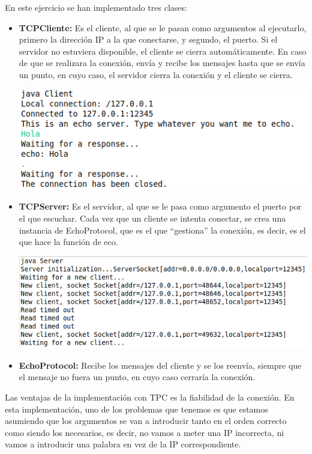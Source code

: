 \documentclass{article}
\begin{document}
En este ejercicio se han implementado tres clases:

\begin{itemize}
\item \textbf{TCPCliente:} Es el cliente, al que se le pasan como argumentos al ejecutarlo, primero la dirección IP a la que conectarse, y segundo, el puerto. Si el servidor no estuviera disponible, el cliente se cierra automáticamente. En caso de que se realizara la conexión, envía y recibe los mensajes hasta que se envía un punto, en cuyo caso, el servidor cierra la conexión y el cliente se cierra.
\begin{center}
\includegraphics[scale=0.4]{images/TCPClient.png}
\end{center}
\item \textbf{TCPServer:} Es el servidor, al que se le pasa como argumento el puerto por el que escuchar. Cada vez que un cliente se intenta conectar, se crea una instancia de EchoProtocol, que es el que “gestiona” la conexión, es decir, es el que hace la función de eco.
\begin{center}
\includegraphics[scale=0.4]{images/TCPServer.png}
\end{center}
\item \textbf{EchoProtocol:} Recibe los mensajes del cliente y se los reenvía, siempre que el mensaje no fuera un punto, en cuyo caso cerraría la conexión.
\end{itemize}

Las ventajas de la implementación con TPC es la fiabilidad de la conexión. En esta implementación, uno de los problemas que tenemos es que estamos asumiendo que los argumentos se van a introducir tanto en el orden correcto como siendo los necesarios, es decir, no vamos a meter una IP incorrecta, ni vamos a introducir una palabra en vez de la IP correspondiente.
\end{document}
